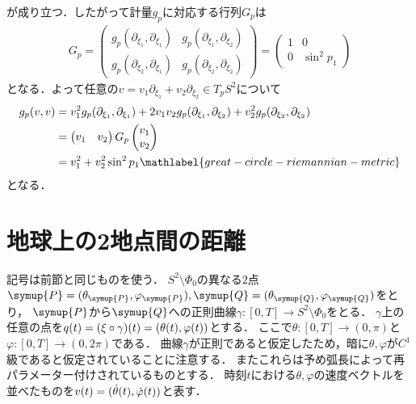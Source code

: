 \documentclass{ltjsarticle}
\begin{document}
が成り立つ．したがって計量\(g_p\)に対応する行列\(G_p\)は
\begin{align*}
    G_p =
    \begin{pmatrix}
        g_p(\partial_{\xi_1}, \partial_{\xi_1}) & g_p(\partial_{\xi_1}, \partial_{\xi_2}) \\
        g_p(\partial_{\xi_2}, \partial_{\xi_1}) & g_p(\partial_{\xi_2}, \partial_{\xi_2})
    \end{pmatrix}
    =
    \begin{pmatrix}
        1 & 0 \\
        0 & \sin^2 p_1
    \end{pmatrix}
\end{align*}
となる．よって任意の\(v = v_1 \partial_{\xi_1} + v_2 \partial_{\xi_2} \in T_p S^2\)について
\begin{align}
    g_p(v, v)
    &= v_1^2 g_p(\partial_{\xi_1}, \partial_{\xi_1}) + 2 v_1 v_2 g_p(\partial_{\xi_1}, \partial_{\xi_2}) + v_2^2 g_p(\partial_{\xi_2}, \partial_{\xi_2}) \notag \\
    &= \begin{pmatrix} v_1 & v_2 \end{pmatrix} G_p \begin{pmatrix} v_1 \\ v_2 \end{pmatrix} \notag \\
    &= v_1^2 + v_2^2 \sin^2 p_1 \mathlabel{great-circle-riemannian-metric}
\end{align}
となる．

\section{地球上の2地点間の距離}
記号は前節と同じものを使う．
\(S^2 \setminus \Phi_0\)の異なる\(2\)点\(\symup{P} = \coord{\theta_{\symup{P}}, \varphi_{\symup{P}}}, \symup{Q} = \coord{\theta_{\symup{Q}}, \varphi_{\symup{Q}}}\)をとり，
\(\symup{P}\)から\(\symup{Q}\)への正則曲線\(\gamma \colon [0, T] \to S^2 \setminus \Phi_0\)をとる．
\(\gamma\)上の任意の点を\(q(t) = (\xi \circ \gamma)(t) = (\theta(t), \varphi(t))\)とする．
ここで\(\theta \colon [0, T] \to (0, \pi)\)と\(\varphi \colon [0, T] \to (0, 2 \pi)\)である．
曲線\(\gamma\)が正則であると仮定したため，暗に\(\theta, \varphi\)が\(C^1\)級であると仮定されていることに注意する．
またこれらは予め弧長によって再パラメーター付けされているものとする．
時刻\(t\)における\(\theta, \varphi\)の速度ベクトルを並べたものを\(v(t) = (\dot{\theta}(t), \dot{\varphi}(t))\)と表す．
\end{document}
